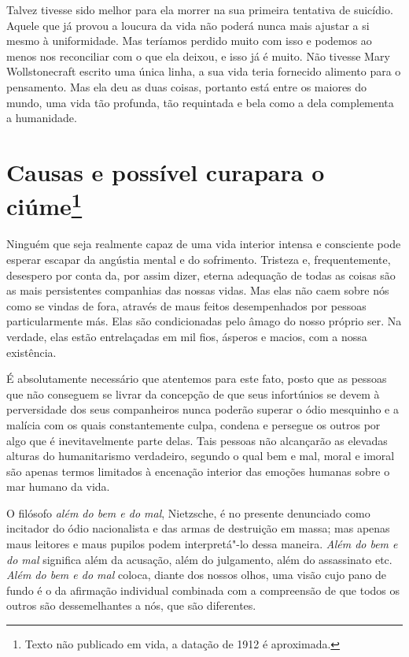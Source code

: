 Talvez tivesse sido melhor para ela morrer na sua primeira tentativa
de suicídio. Aquele que já provou a loucura da vida não poderá nunca mais
ajustar a si mesmo à uniformidade. Mas teríamos perdido muito com isso e
podemos ao menos nos reconciliar com o que ela deixou, e isso já é
muito. Não tivesse Mary Wollstonecraft escrito uma única linha, a sua
vida teria fornecido alimento para o pensamento. Mas ela deu as duas
coisas, portanto está entre os maiores do mundo, uma vida tão profunda,
tão requintada e bela como a dela complementa a humanidade.

\chapter[Causas e possível cura para o ciúme]{Causas e possível cura\break para o ciúme\footnote{Texto não publicado em vida, a datação de 1912 é aproximada.}}

Ninguém que seja realmente capaz de uma vida interior intensa e
consciente pode esperar escapar da angústia mental e do sofrimento.
Tristeza e, frequentemente, desespero por conta da, por assim dizer, eterna
adequação de todas as coisas são as mais persistentes companhias das
nossas vidas. Mas elas não caem sobre nós como se vindas de fora,
através de maus feitos desempenhados por pessoas particularmente más.
Elas são condicionadas pelo âmago do nosso próprio ser. Na verdade, elas
estão entrelaçadas em mil fios, ásperos e macios, com a nossa
existência.

É absolutamente necessário que atentemos para este fato, posto que as
pessoas que não conseguem se livrar da concepção de que seus infortúnios
se devem à perversidade dos seus companheiros nunca poderão superar o
ódio mesquinho e a malícia com os quais constantemente culpa, condena e
persegue os outros por algo que é inevitavelmente parte delas. Tais
pessoas não alcançarão as elevadas alturas do humanitarismo verdadeiro,
segundo o qual bem e mal, moral e imoral são apenas termos limitados à
encenação interior das emoções humanas sobre o mar humano da vida.

O filósofo \textit{além do bem e do mal}, Nietzsche, é no presente denunciado
como incitador do ódio nacionalista e das armas de destruição em massa;
mas apenas maus leitores e maus pupilos podem interpretá"-lo dessa
maneira. \textit{Além do bem e do mal} significa além da acusação, além do
julgamento, além do assassinato etc. \emph{Além do bem e do mal} coloca, diante dos nossos olhos, uma visão cujo pano de fundo é o da afirmação
individual combinada com a compreensão de que todos os outros são
dessemelhantes a nós, que são diferentes.

